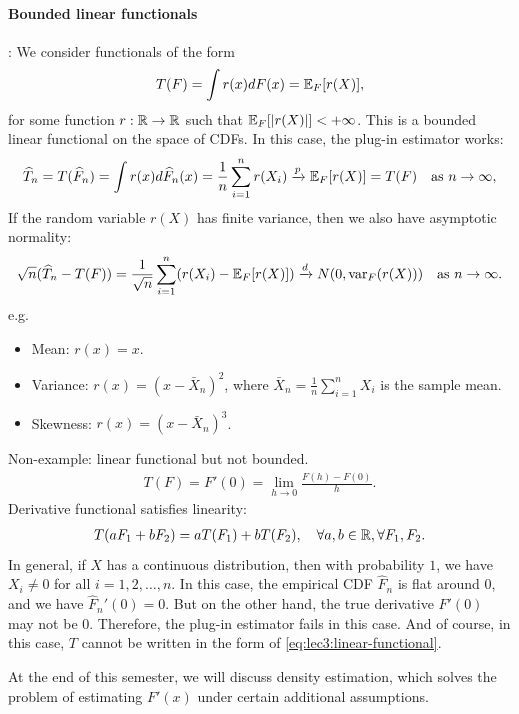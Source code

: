 \documentclass[11pt,letterpaper]{article}
\numberwithin{assumption}{lecture}
\numberwithin{theorem}{lecture}
\numberwithin{proposition}{lecture}
\numberwithin{lemma}{lecture}
\numberwithin{claim}{lecture}
\numberwithin{corollary}{lecture}
\numberwithin{definition}{lecture}
\numberwithin{conjecture}{lecture}
\numberwithin{remark}{lecture}
\numberwithin{example}{lecture}
\numberwithin{equation}{lecture}
\begin{document}
\paragraph{Bounded linear functionals}: We consider functionals of the form
\begin{align}
  T(F) = \int r(x) dF(x) = {\mathbb{E}}_F[r(X)],\label{eq:lec3:linear-functional}
\end{align}
for some function $r: \mathbb{R} \to \mathbb{R}$ such that ${\mathbb{E}}_F[|r(X)|] < +\infty$. This is a bounded linear functional on the space of CDFs. In this case, the plug-in estimator works:
\begin{align*}
  \widehat{T}_n = T(\widehat{F}_n) = \int r(x) d\widehat{F}_n(x) = \frac{1}{n} \sum_{i=1}^n r(X_i) \xrightarrow{p} {\mathbb{E}}_F[r(X)] = T(F) \quad \text{as } n \to \infty,
\end{align*}
If the random variable $r(X)$ has finite variance, then we also have asymptotic normality:
\begin{align*}
  \sqrt{n} (\widehat{T}_n - T(F)) = \frac{1}{\sqrt{n}} \sum_{i=1}^n (r(X_i) - {\mathbb{E}}_F[r(X)]) \xrightarrow{d} N(0, \operatorname{var}_F(r(X))) \quad \text{as } n \to \infty.
\end{align*}
e.g.
\begin{itemize}
\item Mean: $r(x) = x$.
\item Variance: $r(x) = (x - \bar{X}_n)^2$, where $\bar{X}_n = \frac{1}{n} \sum_{i=1}^n X_i$ is the sample mean.
\item Skewness: $r(x) = (x - \bar{X}_n)^3$.
\end{itemize}
Non-example: linear functional but not bounded.
\begin{align*}
  T (F) = F' (0) = \lim_{h \to 0} \frac{F(h) - F(0)}{h}.
\end{align*}
Derivative functional satisfies linearity:
\begin{align*}
  T (a F_1 + b F_2) = a T(F_1) + b T(F_2), \quad \forall a, b \in \mathbb{R}, \forall F_1, F_2.
\end{align*}
In general, if $X$ has a continuous distribution, then with probability $1$, we have $X_i \neq 0$ for all $i = 1, 2, \ldots, n$. In this case, the empirical CDF $\widehat{F}_n$ is flat around $0$, and we have $\widehat{F}_n' (0) = 0$. But on the other hand, the true derivative $F' (0)$ may not be $0$. Therefore, the plug-in estimator fails in this case. And of course, in this case, $T$ cannot be written in the form of \eqref{eq:lec3:linear-functional}.

At the end of this semester, we will discuss density estimation, which solves the problem of estimating $F' (x)$ under certain additional assumptions.
\end{document}
